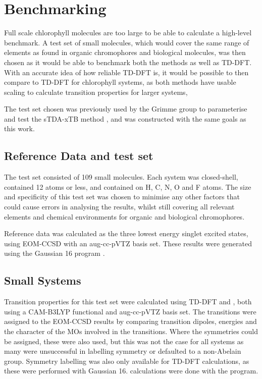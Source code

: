 \section{Benchmarking}
\label{sec:benchmarking}
Full scale chlorophyll molecules are too large to be able to calculate a high-level
benchmark. A test set of small molecules, which would cover the same range of elements
as found in organic chromophores and biological molecules, was then chosen as 
it would be able to benchmark both the \dscf methods as well as TD-DFT. With an 
accurate idea of how reliable TD-DFT is, it would be possible to then compare 
\dscf to TD-DFT for chlorophyll systems, as both methods have usable scaling to
calculate transition properties for larger systems, 

The test set chosen was previously used by the Grimme group to parameterise and
test the sTDA-xTB method \cite{Grimme2017}, and was constructed with the same goals
as this work.

\subsection{Reference Data and test set}
\label{subsec:reference_data}
The test set consisted of 109 small molecules. Each system was closed-shell, 
contained 12 atoms or less, and contained on H, C, N, O and F atoms. The size and
specificity of this test set was chosen to minimise any other factors that
could cause errors in analysing the results, whilst still covering all relevant elements
and chemical environments for organic and biological chromophores.

Reference data was calculated as the three lowest energy singlet excited states, 
using EOM-CCSD with an aug-cc-pVTZ basis set. These results were generated
using the Gaussian 16 program \cite{Gaussian16}.

\subsection{Small Systems}
\label{subsec:smalltest}
Transition properties for this test set were calculated using TD-DFT and \dscf,
both using a CAM-B3LYP functional and aug-cc-pVTZ basis set. The transitions were
assigned to the EOM-CCSD results by comparing transition dipoles, energies and 
the character of the MOs involved in the transitions. Where the symmetries could
be assigned, these were also used, but this was not the case for all systems
as many were unsuccessful in labelling symmetry or defaulted to a non-Abelain group.
Symmetry labelling was also only available for TD-DFT calculations, as these were
performed with Gaussian 16. \dscf calculations were done with the 
program.


